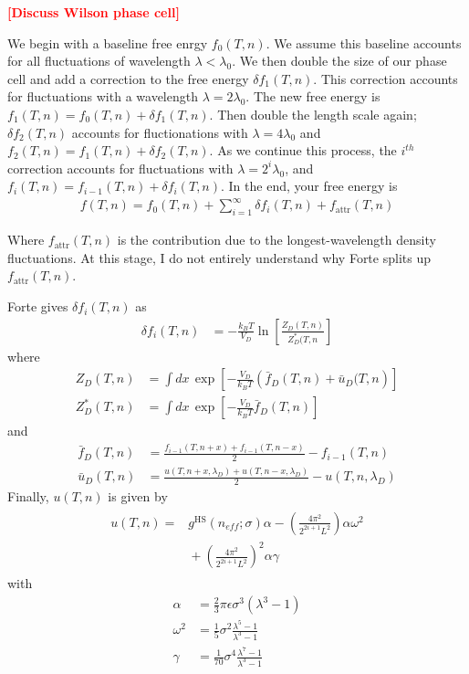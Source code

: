 \documentclass[letterpaper,twocolumn,amsmath,amssymb,prb]{revtex4-1}
\newcommand{\kT}{\ensuremath{k_BT}}
\newcommand{\fattr}{\ensuremath{f_\text{attr}(T,n)}}
\newcommand{\1}{\ensuremath{\textbf{r}_1}}
\newcommand{\2}{\ensuremath{\textbf{r}_2}}
\newcommand{\3}{\ensuremath{\textbf{r}_3}}
\newcommand{\4}{\ensuremath{\textbf{r}_4}}
\newcommand{\fixme}[1]{\textcolor{red}{\textbf{[#1]}}}
\begin{document}
\fixme{Discuss Wilson phase cell}

We begin with a baseline free enrgy $f_0(T,n)$. We assume this
baseline accounts for all fluctuations of wavelength $\lambda <
\lambda_0$. We then double the size of our phase cell and add a
correction to the free energy $\delta f_1(T,n)$. This correction
accounts for fluctuations with a wavelength $\lambda =
2\lambda_0$. The new free energy is $f_1(T,n) = f_0(T,n) + \delta
f_1(T,n)$. Then double the length scale again; $\delta f_2(T,n)$
accounts for fluctionations with $\lambda = 4\lambda_0$ and $f_2(T,n)
= f_1(T,n) + \delta f_2(T,n)$. As we continue this process, the
$i^{th}$ correction accounts for fluctuations with $\lambda =
2^i\lambda_0$, and $f_i(T,n) = f_{i-1}(T,n) + \delta f_i(T,n)$. In the
end, your free energy is
\begin{align}
  f(T,n) = f_0(T,n) + \sum_{i=1}^\infty\delta f_i(T,n) + \fattr
\end{align}

Where $\fattr$ is the contribution due to the longest-wavelength
density fluctuations. At this stage, I do not entirely understand why
Forte splits up $\fattr$.

Forte gives $\delta f_i(T,n)$ as
\begin{align}
  \delta f_i(T,n) &= -\frac{\kT}{V_D}\ln\left[ \frac{Z_D(T,n)}{Z_D^*(T,n} \right]
\end{align}
where
\begin{align}
  Z_D(T,n) &= \int dx\, \exp\left[ -\frac{V_D}{\kT}\left( \bar{f}_D(T,n) + \bar{u}_D(T,n \right) \right] \\
  Z_D^*(T,n) &= \int dx\, \exp\left[ -\frac{V_D}{\kT}\bar{f}_D(T,n) \right]
\end{align}
and
\begin{align}
  \bar{f}_D(T,n) &= \frac{f_{i-1}(T,n+x) + f_{i-1}(T,n-x)}{2} - f_{i-1}(T,n) \\
  \bar{u}_D(T,n) &= \frac{u(T,n+x,\lambda_D) + u(T,n-x,\lambda_D)}{2} - u(T,n,\lambda_D)
\end{align}
Finally, $u(T,n)$ is given by
\begin{align}
  \begin{split}
  u(T,n) = &{} g^\text{HS}(n_{eff};\sigma)\alpha - \left( \frac{4\pi^2}{2^{2i+1}L^2} \right)\alpha\omega^2 \\ &{} + \left( \frac{4\pi^2}{2^{2i+1}L^2} \right)^2\alpha\gamma
  \end{split}
\end{align}
with
\begin{align}
  \alpha &= \frac{2}{3}\pi\epsilon\sigma^3(\lambda^3 - 1) \\
  \omega^2 &= \frac{1}{5}\sigma^2\frac{\lambda^5 - 1}{\lambda^3 - 1} \\
  \gamma &= \frac{1}{70}\sigma^4\frac{\lambda^7 - 1}{\lambda^3 - 1}
\end{align}
\end{document}
